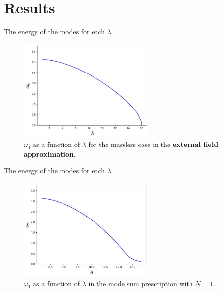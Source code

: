 \section{Results}

\begin{frame}{The energy of the modes for each $\lambda$}
	\begin{figure}[h]
		\centering
		\caption{$\omega_1$ as a function of $\lambda$ for the massless case in the \textbf{external field approximation}.}
		\label{fig:figures-eigenvalue_evolution_a_1_0-png}
		\includegraphics[width=0.6\textwidth]{figures/eigenvalues-external-field-approximation.png}
	\end{figure}
\end{frame}

\begin{frame}{The energy of the modes for each $\lambda$}
\begin{figure}[h]
	\centering
	\caption{$\omega_1$ as a function of $\lambda$ in the mode sum prescription with $N=1$. }
	\label{fig:figures-eigenvalues_ambjorn}
	\includegraphics[width=0.6\textwidth]{figures/eigenvalues_ambjorn.png}
\end{figure}
\end{frame}

